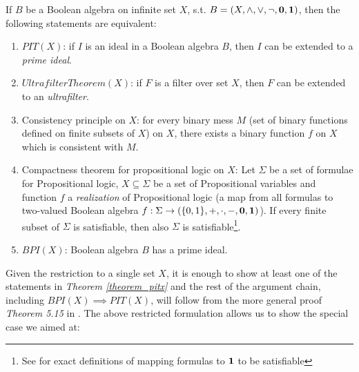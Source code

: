 \begin{theorem}\label{theorem_pitx}
  If $B$ be a Boolean algebra on infinite set $X$, s.t. $B = (X,\land,\lor,\neg,\bf{0}, \bf{1})$, then the following statements are equivalent:
  \begin{enumerate}
    \item $PIT(X)$: if $I$ is an ideal in a Boolean algebra $B$, then $I$ can be extended to a \textit{prime ideal}.
    \item $UltrafilterTheorem(X)$: if $F$ is a filter over set $X$, then $F$ can be extended to an \textit{ultrafilter}.
    \item Consistency principle on $X$: for every binary mess $M$ (set of binary functions defined on finite subsets of $X$) on $X$, there exists a binary function $f$ on $X$ which is consistent with $M$.
    \item Compactness theorem for propositional logic on $X$: Let $\Sigma$ be a set of formulae for Propositional logic, $X \subseteq \Sigma$ be a set of Propositional variables and function $f$ a \textit{realization} of Propositional logic (a map from all formulas to two-valued Boolean algebra $f: \Sigma \to (\{0,1\},+,\cdot,-,\bf{0},\bf{1})$). If every finite subset of $\Sigma$ is satisfiable, then also $\Sigma$ is satisfiable\footnote{See \cite{halbeisen2012} for exact definitions of mapping formulas to $\bf{1}$ to be satisfiable}.  
    \item $BPI(X)$: Boolean algebra $B$ has a prime ideal.
  \end{enumerate}
\end{theorem}

Given the restriction to a single set $X$, it is enough to show at least one of the statements in \textit{Theorem \ref{theorem_pitx}} and the rest of the argument chain, including $BPI(X) \implies PIT(X)$, will follow from the more general proof \textit{Theorem 5.15} in \cite{halbeisen2012}. The above restricted formulation allows us to show the special case we aimed at:

